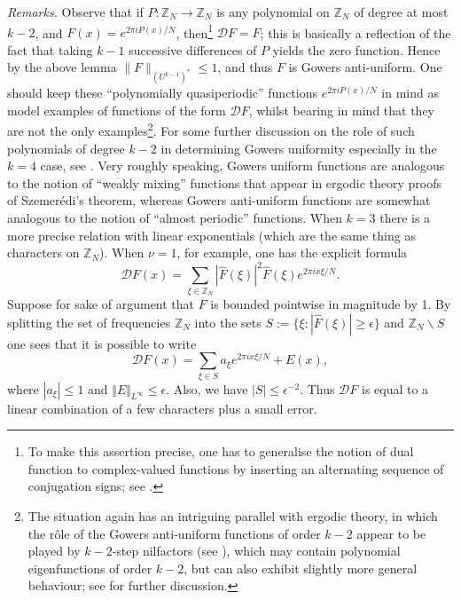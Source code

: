 \documentclass[12pt,a4paper,reqno]{amsart}
\numberwithin{equation}{section}
\theoremstyle{plain}
\theoremstyle{definition}
\renewcommand{\leq}{\leqslant}
\renewcommand{\geq}{\geqslant}
\def\Z{{\mathbb Z}}
\def\vs{\vspace{11pt}}
\begin{document}
\noindent\textit{Remarks.} Observe that
if $P: \mathbb{Z}_N \to \mathbb{Z}_N$ is any polynomial on $\mathbb{Z}_N$ of degree
at most $k-2$, and $F(x) = e^{2\pi i P(x)/N}$, then\footnote{To make this assertion precise, one has to generalise the notion of dual function
to complex-valued functions by inserting an alternating sequence of conjugation signs; see \cite{gowers}.}
 ${\mathcal D} F = F$; this is basically
a reflection of the fact that taking $k-1$ successive differences of $P$ yields the zero function. Hence
by the above lemma $\|F\|_{(U^{k-1})^*} \leq 1$, and thus $F$ is Gowers anti-uniform.  One should keep these 
``polynomially quasiperiodic'' functions $e^{2\pi i P(x)/N}$ in mind as model examples of functions 
of the form ${\mathcal D} F$, whilst bearing in mind that they are not the only examples\footnote{The situation again has an intriguing parallel with ergodic theory, in which the r\^ ole of the Gowers anti-uniform functions of order $k-2$ appear to be played by $k-2$-step nilfactors (see \cite{host-kra2,host-kra3,ziegler}), which may contain polynomial eigenfunctions of order $k-2$, but can also exhibit slightly more general behaviour; see \cite{furst-weiss} for further discussion.}. For some further discussion on the role of such polynomials of degree $k-2$ in determining Gowers uniformity especially in the $k=4$ case, 
see \cite{gowers-4,gowers}.
Very roughly speaking, Gowers uniform
functions are analogous to the notion of ``weakly mixing'' functions that appear in ergodic theory proofs of
Szemer\'edi's theorem, whereas Gowers anti-uniform functions are somewhat analogous to the notion of 
``almost periodic'' functions. When $k =3$ there is a more precise relation with linear exponentials (which are the same thing as characters on $\mathbb{Z}_N$). When $\nu = 1$, for example, one has the explicit formula
\begin{equation}\label{dagger} {\mathcal D} F(x) = \sum_{\xi \in \mathbb{Z}_N} |\widehat{F}(\xi)|^2\widehat{F}(\xi) e^{2\pi i x \xi/N}.\end{equation}
Suppose for sake of argument that $F$ is bounded pointwise in magnitude by 1.
By splitting the set of frequencies $\mathbb{Z}_N$ into the sets $S := \{\xi : |\widehat{F}(\xi)| \geq \epsilon\}$ and $\Z_N \backslash S$ one sees that it is possible to write 
\[ \mathcal{D}F(x) = \sum_{\xi \in S} a_{\xi} e^{2\pi i x\xi/N} + E(x),\]
where $|a_{\xi}| \leq 1$ and $\Vert E \Vert_{L^\infty} \leq \epsilon$. Also, we have $|S| \leq \epsilon^{-2}$. Thus $\mathcal{D}F$ is equal to a linear combination of a few characters plus a small error.\vs
\end{document}
